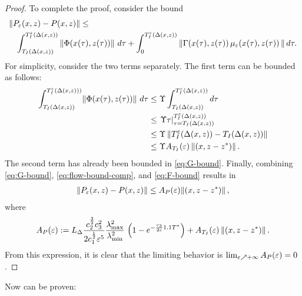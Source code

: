 \begin{proof}
  To complete the proof, consider the bound
  \begin{align}
    \label{eq:flow-bound-comp}
    \lefteqn{\left\| \Pe\argsxz - \P\argsxz \right\| \leq}\\
    \nonumber
    && \int_{\TIDelta}^{\TIeDelta} \left\| \bigF\argsxztau \right\| \, d\tau  + \int_{0}^{\TIeDelta} \left\| \bigG\argsxztau \, \mueps\argsxztau \, \right\| d\tau.
  \end{align}
  For simplicity, consider the two terms separately.
  The first term can be bounded as follows:
  \begin{align}
    \nonumber
    \int_{T_{I}(\Delta(x, z))}^{T_{I}^{\varepsilon}(\Delta(x, z)))} \! \left\| \Phi(x(\tau), z(\tau)) \right\| \, d\tau
    &\leq \Upsilon \int_{T_{I}(\Delta(x, z))}^{T_{I}^{\varepsilon}(\Delta(x, z))} d\tau\\
    \nonumber
    &\leq \left.\Upsilon \tau\right|_{\tau=T_{I}(\Delta(x, z))}^{T_{I}^{\varepsilon}(\Delta(x, z))}\\
    \nonumber
    &\leq \Upsilon \left\|T_{I}^{\varepsilon}(\Delta(x, z)) - T_{I}(\Delta(x, z))\right\|\\
    &\leq \Upsilon A_{T_{I}}(\varepsilon) \left\|(x, z - z^{*})\right\|.
    \label{eq:F-bound}
  \end{align}
  The second term has already been bounded in \eqref{eq:G-bound}.
  Finally, combining \eqref{eq:G-bound}, \eqref{eq:flow-bound-comp}, and \eqref{eq:F-bound} results in
  \begin{align}
    \left\| P_{\varepsilon}(x, z) - P(x, z) \right\| \leq A_{P}(\varepsilon) \! \left\|(x, z - z^{*})\right\|,
  \end{align}
  where
  \begin{align}
    \Ae := \LDelta \frac{c_{2}^{\frac{3}{2}} c_{3}^{2}}{2c_{1}^{\frac{1}{2}}\resclfparam^{5}} \frac{\lambdamaxG^{2}}{\lambdaminG^{2}}  \, \left(1 - e^{-\frac{c_{3}}{2\resclfparam} 1.1 \Tst}\right) + \ATIe\nzdxzst. %
  \end{align}
  From this expression, it is clear that the limiting behavior is $\lim_{\varepsilon \nearrow +\infty} A_{P}(\varepsilon) = 0$.


\end{proof}


Now  can be proven:

